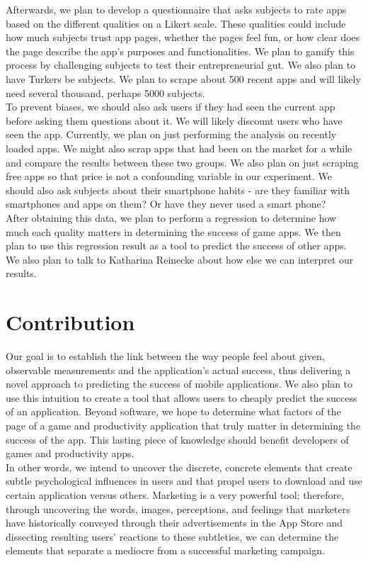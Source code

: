 \documentclass{article}
\begin{document}
Afterwards, we plan to develop a questionnaire that asks subjects to rate apps based on the different qualities on a Likert scale. These qualities could include how much subjects trust app pages, whether the pages feel fun, or how clear does the page describe the app’s purposes and functionalities. We plan to gamify this process by challenging subjects to test their entrepreneurial gut. We also plan to have Turkers be subjects. We plan to scrape about 500 recent apps and will likely need several thousand, perhaps 5000 subjects. \\

To prevent biases, we should also ask users if they had seen the current app before asking them questions about it. We will likely discount users who have seen the app. Currently, we plan on just performing the analysis on recently loaded apps. We might also scrap apps that had been on the market for a while and compare the results between these two groups. We also plan on just scraping free apps so that price is not a confounding variable in our experiment. We should also ask subjects about their smartphone habits - are they familiar with smartphones and apps on them? Or have they never used a smart phone? \\

After obtaining this data, we plan to perform a regression to determine how much each quality matters in determining the success of game apps. We then plan to use this regression result as a tool to predict the success of other apps. We also plan to talk to Katharina Reinecke about how else we can interpret our results.

\section{Contribution}

Our goal is to establish the link between the way people feel about given, observable measurements and the application's actual success, thus delivering a novel approach to predicting the success of mobile applications. We also plan to use this intuition to create a tool that allows users to cheaply predict the success of an application. Beyond software, we hope to determine what factors of the page of a game and productivity application that truly matter in determining the success of the app. This lasting piece of knowledge should benefit developers of games and productivity apps. \\
 
In other words, we intend to uncover the discrete, concrete elements that create subtle psychological influences in users and that propel users to download and use certain  application versus others.  Marketing is a very powerful tool; therefore, through uncovering the words, images, perceptions, and feelings that marketers have historically conveyed through their advertisements in the App Store and dissecting resulting users’ reactions to these subtleties, we can determine the elements that separate a mediocre from a successful marketing campaign. 
\end{document}
